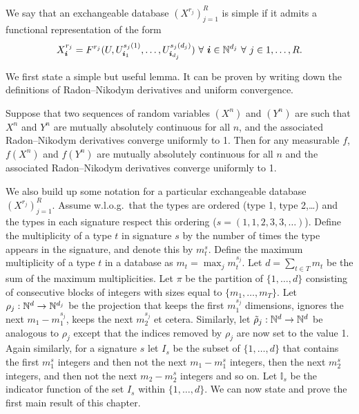 We say that an exchangeable database $(X^{r_j})_{j=1}^R$ is simple if it admits a functional representation of the form
\begin{equation}
  X^{r_j}_{\bm{i}} = F^{r_j}(U, U^{s_{j}(1)}_{\bm{i}_1},\dots,U^{s_{j}(d_j)}_{\bm{i}_{d_j}}) \,\, \forall \,\, \bm{i} \in \mathbb{N}^{d_j} \,\, \forall \,\, j \in {1,\dots,R}.
\end{equation}

We first state a simple but useful lemma.
It can be proven by writing down the definitions of Radon--Nikodym derivatives and uniform convergence.

\begin{lem}
  \label{lem:contractionrnd}
  Suppose that two sequences of random variables $(X^n)$ and $(Y^n)$ are such that $X^n$ and $Y^n$ are mutually absolutely continuous for all $n$, and the associated Radon--Nikodym derivatives converge uniformly to 1.
  Then for any measurable $f$, $f(X^n)$ and $f(Y^n)$ are mutually absolutely continuous for all $n$ and the associated Radon--Nikodym derivatives converge uniformly to 1.
\end{lem}

We also build up some notation for a particular exchangeable database $(X^{r_j})_{j=1}^R$.
Assume w.l.o.g.\ that the types are ordered (\eg type 1, type 2,\dots) and the types in each signature respect this ordering (\eg $s = (1,1,2,3,3,\dots)$).
Define the multiplicity of a type $t$ in signature $s$ by the number of times the type appears in the signature, and denote this by $m_{t}^s$.
Define the maximum multiplicity of a type $t$ in a database as $m_t = \max_j m_t^{s_j}$.
Let $d = \sum_{t\in T} m_t$ be the sum of the maximum multiplicities.
Let $\pi$ be the partition of $\{1,\ldots,d\}$ consisting of consecutive blocks of integers with sizes equal to $\{m_1,\ldots,m_T\}$.
Let $\rho_j : \mathbb{N}^d \to \mathbb{N}^{d_j}$ be the projection that keeps the first $m_{1}^{s_j}$ dimensions, ignores the next $m_1 - m_{1}^{s_j}$, keeps the next $m_{2}^{s_j}$ et cetera.
Similarly, let $\tilde{\rho}_j : \mathbb{N}^d \to \mathbb{N}^d$ be analogous to $\rho_j$ except that the indices removed by $\rho_j$ are now set to the value 1.
Again similarly, for a signature $s$ let $I_s$ be the subset of $\{1,\ldots,d\}$ that contains the first $m_1^s$ integers and then not the next $m_1 - m_1^s$ integers, then the next $m_2^s$ integers, and then not the next $m_2 - m_2^s$ integers and so on.
Let $\mathbb{I}_s$ be the indicator function of the set $I_s$ within $\{1,\ldots,d\}$.
We can now state and prove the first main result of this chapter.


